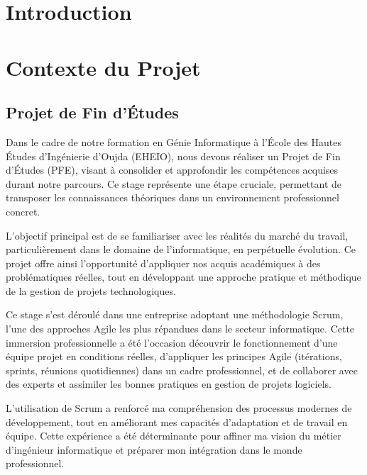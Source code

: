 \documentclass[12pt,a4paper]{report}
\begin{document}
	\thispagestyle{empty}
	
	\listoffigures
	\thispagestyle{empty}   %
	
	\listoftables
	\thispagestyle{empty}
	
	\tableofcontents
	\thispagestyle{empty}
	
	\clearpage
	\pagestyle{plain}
	
	\chapter*{Introduction}
	
	\chapter{Contexte du Projet}
	
	\section{Projet de Fin d’Études}
	
	Dans le cadre de notre formation en Génie Informatique à l’École des Hautes Études d’Ingénierie d’Oujda (EHEIO), nous devons réaliser un Projet de Fin d’Études (PFE), visant à consolider et approfondir les compétences acquises durant notre parcours. Ce stage représente une étape cruciale, permettant de transposer les connaissances théoriques dans un environnement professionnel concret.
	
	L’objectif principal est de se familiariser avec les réalités du marché du travail, particulièrement dans le domaine de l’informatique, en perpétuelle évolution. Ce projet offre ainsi l’opportunité d’appliquer nos acquis académiques à des problématiques réelles, tout en développant une approche pratique et méthodique de la gestion de projets technologiques.
	
	Ce stage s’est déroulé dans une entreprise adoptant une méthodologie Scrum, l’une des approches Agile les plus répandues dans le secteur informatique. Cette immersion professionnelle a été l’occasion découvrir le fonctionnement d’une équipe projet en conditions réelles, d'appliquer les principes Agile (itérations, sprints, réunions quotidiennes) dans un cadre professionnel, et de collaborer avec des experts et assimiler les bonnes pratiques en gestion de projets logiciels.
	
	L’utilisation de Scrum a renforcé ma compréhension des processus modernes de développement, tout en améliorant mes capacités d’adaptation et de travail en équipe. Cette expérience a été déterminante pour affiner ma vision du métier d’ingénieur informatique et préparer mon intégration dans le monde professionnel.
	
\end{document}
